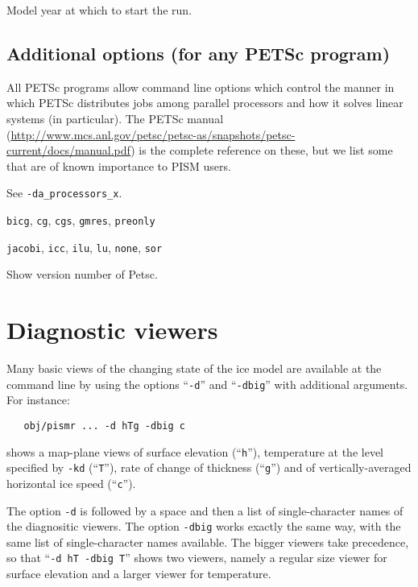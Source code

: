 \documentclass[11pt,final]{amsart}
\renewcommand{\t}[1]{\texttt{#1}}
\begin{document}
 Model year at which to start the run.


\subsection{Additional options (for any PETSc program)}  All PETSc programs allow command line options which control the manner in which PETSc distributes jobs among parallel processors and how it solves linear systems (in particular).  The PETSc manual (\url{http://www.mcs.anl.gov/petsc/petsc-as/snapshots/petsc-current/docs/manual.pdf}) is the complete reference on these, but we list some that are of known importance to PISM users.


  See \verb|-da_processors_x|.




  \t{bicg}, \t{cg}, \t{cgs}, \t{gmres}, \t{preonly}


   \t{jacobi}, \t{icc}, \t{ilu}, \t{lu}, \t{none}, \t{sor}

   Show version number of Petsc.


\section{Diagnostic viewers} 

Many basic views of the changing state of the ice model are available at the command line by using the options ``\t{-d}'' and ``\t{-dbig}'' with additional arguments.  For instance:
\begin{verbatim}
   obj/pismr ... -d hTg -dbig c
\end{verbatim}
shows a map-plane views of surface elevation (``\t{h}''), temperature at the level specified by \t{-kd} (``\t{T}''), rate of change of thickness (``\t{g}'') and of vertically-averaged horizontal ice speed (``\t{c}'').

The option \t{-d} is followed by a space and then a list of single-character names of the diagnositic viewers.  The option \t{-dbig} works exactly the same way, with the same list of single-character names available.  The bigger viewers take precedence, so that ``\t{-d hT -dbig T}'' shows two viewers, namely a regular size viewer for surface elevation and a larger viewer for temperature.
\end{document}
